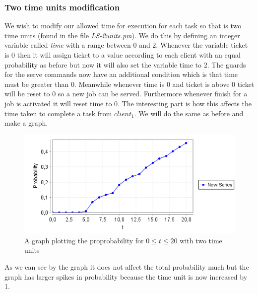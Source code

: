 \documentclass[12pt]{report}
\begin{document}
\subsubsection*{Two time units modification}
We wish to modify our allowed time for execution for each task so that is two time units (found in the file \emph{LS-2units.pm}). We do this by defining an integer variable called \emph{time} with a range between 0 and 2. Whenever the variable ticket is 0 then it will assign ticket to a value according to each client with an equal probability as before but now it will also set the variable time to 2. The guards for the serve commands now have an additional condition which is that time must be greater than 0. Meanwhile whenever time is 0 and ticket is above 0 ticket will be reset to 0 so a new job can be served. Furthermore whenever finish for a job is activated it will reset time to 0. The interesting part is how this affects the time taken to complete a task from $client_1$. We will do the same as before and make a graph.
\begin{figure}[H]
	\centering
	\includegraphics[scale=0.75]{../GFX/B1-1e.png}
	\caption{A graph plotting the proprobability for $0 \leq t \leq 20$ with two time units}
\end{figure}
As we can see by the graph it does not affect the total probability much but the graph has larger spikes in probability because the time unit is now increased by 1.
\end{document}
